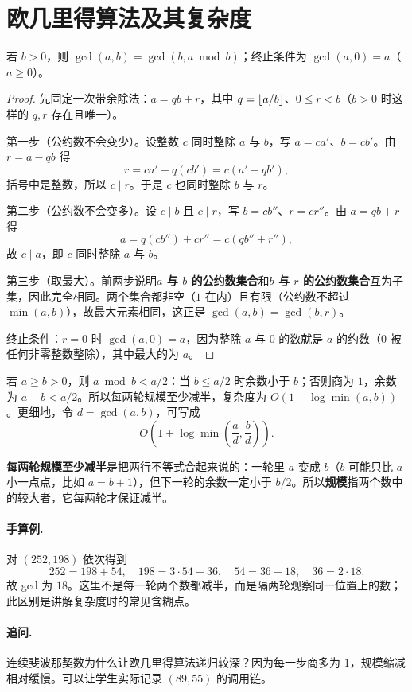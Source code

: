 \section{欧几里得算法及其复杂度}
\begin{theorem}
若 $b>0$，则 $\gcd(a,b)=\gcd(b,a\bmod b)$；终止条件为 $\gcd(a,0)=a$（$a\ge0$）。
\end{theorem}
\begin{proof}
先固定一次带余除法：$a=qb+r$，其中 $q=\left\lfloor a/b\right\rfloor$、$0\le r<b$（$b>0$ 时这样的 $q,r$ 存在且唯一）。

第一步（公约数不会变少）。设整数 $c$ 同时整除 $a$ 与 $b$，写 $a=ca'$、$b=cb'$。由 $r=a-qb$ 得
\[
 r=ca'-q(cb')=c(a'-qb'),
\]
括号中是整数，所以 $c\mid r$。于是 $c$ 也同时整除 $b$ 与 $r$。

第二步（公约数不会变多）。设 $c\mid b$ 且 $c\mid r$，写 $b=cb''$、$r=cr''$。由 $a=qb+r$ 得
\[
 a=q(cb'')+cr''=c(qb''+r''),
\]
故 $c\mid a$，即 $c$ 同时整除 $a$ 与 $b$。

第三步（取最大）。前两步说明\textbf{$a$ 与 $b$ 的公约数集合}和\textbf{$b$ 与 $r$ 的公约数集合}互为子集，因此完全相同。两个集合都非空（$1$ 在内）且有限（公约数不超过 $\min(a,b)$），故最大元素相同，这正是 $\gcd(a,b)=\gcd(b,r)$。

终止条件：$r=0$ 时 $\gcd(a,0)=a$，因为整除 $a$ 与 $0$ 的数就是 $a$ 的约数（$0$ 被任何非零整数整除），其中最大的为 $a$。
\end{proof}
若 $a\ge b>0$，则 $a\bmod b<a/2$：当 $b\le a/2$ 时余数小于 $b$；否则商为 $1$，余数为 $a-b<a/2$。所以每两轮规模至少减半，复杂度为 $O(1+\log\min(a,b))$。更细地，令 $d=\gcd(a,b)$，可写成
\[
 O\!\left(1+\log\min\left(\frac ad,\frac bd\right)\right).
\]

\begin{tip}
\textbf{每两轮规模至少减半}是把两行不等式合起来说的：一轮里 $a$ 变成 $b$（$b$ 可能只比 $a$ 小一点点，比如 $a=b+1$），但下一轮的余数一定小于 $b/2$。所以\textbf{规模}指两个数中的较大者，它每两轮才保证减半。
\end{tip}



\paragraph{手算例.} 对 $(252,198)$ 依次得到
\[
252=198+54,\quad198=3\cdot54+36,\quad54=36+18,\quad36=2\cdot18.
\]
故 gcd 为 $18$。这里不是每一轮两个数都减半，而是隔两轮观察同一位置上的数；此区别是讲解复杂度时的常见含糊点。
\paragraph{追问.} 连续斐波那契数为什么让欧几里得算法递归较深？因为每一步商多为 $1$，规模缩减相对缓慢。可以让学生实际记录 $(89,55)$ 的调用链。


